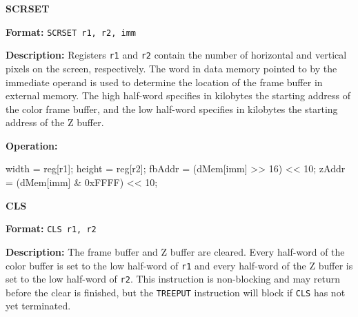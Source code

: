 \noindent\textsf{\textbf{\Large SCRSET}}\par
{}\par\begin{indented}{\bf Format:}
{\tt SCRSET r1, r2, imm}\par\vspace{3ex}
\end{indented}\vspace{4ex}
\begin{indented}{\bf Description:}
Registers {\tt r1} and {\tt r2} contain the number of horizontal and
vertical pixels on the screen, respectively.  The word in data memory
pointed to by the immediate operand is used to determine the location
of the frame buffer in external memory.  The high half-word specifies
in kilobytes the starting address of the color frame buffer, and the
low half-word specifies in kilobytes the starting address of the Z
buffer.
\end{indented}
\begin{indented}{\bf Operation:}\vspace{.8ex}
\begin{verbatimtab}
width = reg[r1];
height = reg[r2];
fbAddr = (dMem[imm] >> 16) << 10;
zAddr = (dMem[imm] & 0xFFFF) << 10;
\end{verbatimtab}
\end{indented}
\vspace{2em}

\newpage
\noindent\textsf{\textbf{\Large CLS}}\par
{}\par\begin{indented}{\bf Format:}
{\tt CLS r1, r2}\par\vspace{3ex}
\end{indented}\vspace{4ex}
\begin{indented}{\bf Description:}
The frame buffer and Z buffer are cleared.  Every half-word of the
color buffer is set to the low half-word of {\tt r1} and every
half-word of the Z buffer is set to the low half-word of {\tt r2}. 
This instruction is non-blocking and may return before the clear is
finished, but the {\tt TREEPUT} instruction will block if {\tt CLS}
has not yet terminated.
\end{indented}
\vspace{2em}

